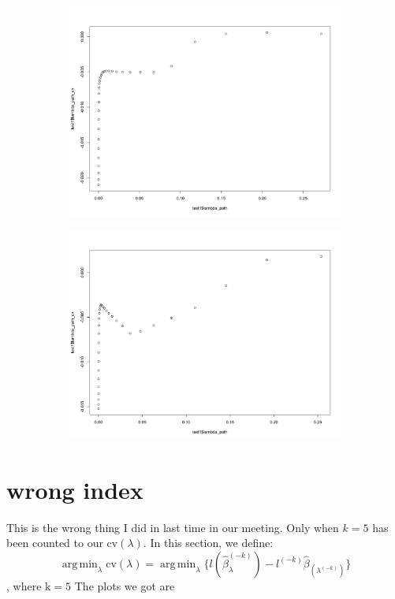 \documentclass[letterpaper]{article}
\DeclareMathOperator*{\argmin}{arg\,min}
\begin{document}
\begin{figure}[H]
\centering
\begin{subfigure}{0.5\textwidth}
  \centering
  \includegraphics[width=1\linewidth]{./result_plot/correct/9_path_plot}
\end{subfigure}%
\begin{subfigure}{.5\textwidth}
  \centering
  \includegraphics[width=1\linewidth]{./result_plot/correct/10_path_plot}
\end{subfigure}

\end{figure}

\section{wrong index}
\label{sec:wrong}
This is the wrong thing I did in last time in our meeting.
Only when $k=5$ has been counted to our $\text{cv}(\lambda)$.
In this section, we define:
$$
\argmin_{\lambda}\text{cv}(\lambda)=\argmin_{\lambda}\{l(\hat{\beta}_\lambda^{(-k)})-l^{(-k)}\hat{\beta}_(\lambda^{(-k)})\}
$$,
where $\text{k} = 5$
The plots we got are
\end{document}
